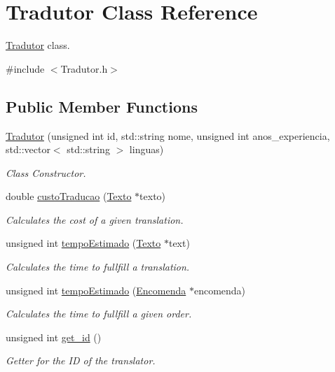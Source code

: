 \hypertarget{class_tradutor}{\section{Tradutor Class Reference}
\label{class_tradutor}
}


\hyperlink{class_tradutor}{Tradutor} class.  




{\ttfamily \#include $<$Tradutor.\-h$>$}

\subsection*{Public Member Functions}
\begin{DoxyCompactItemize}
\item 
\hyperlink{class_tradutor_a856f362e6c97ea42d04875e6c9d012e3}{Tradutor} (unsigned int id, std\-::string nome, unsigned int anos\-\_\-experiencia, std\-::vector$<$ std\-::string $>$ linguas)
\begin{DoxyCompactList}\small\item\em Class Constructor. \end{DoxyCompactList}\item 
double \hyperlink{class_tradutor_ab55718903fb3e7cc5c1b21b87d64393a}{custo\-Traducao} (\hyperlink{class_texto}{Texto} $\ast$texto)
\begin{DoxyCompactList}\small\item\em Calculates the cost of a given translation. \end{DoxyCompactList}\item 
unsigned int \hyperlink{class_tradutor_a1ca7c608db7e9145e8b9105e19e5900a}{tempo\-Estimado} (\hyperlink{class_texto}{Texto} $\ast$text)
\begin{DoxyCompactList}\small\item\em Calculates the time to fullfill a translation. \end{DoxyCompactList}\item 
unsigned int \hyperlink{class_tradutor_acd53cf00b851be61350100c9aa6ef3c0}{tempo\-Estimado} (\hyperlink{class_encomenda}{Encomenda} $\ast$encomenda)
\begin{DoxyCompactList}\small\item\em Calculates the time to fullfill a given order. \end{DoxyCompactList}\item 
unsigned int \hyperlink{class_tradutor_adc3d4f5ae46ebd92072c644f9fe0e479}{get\-\_\-id} ()
\begin{DoxyCompactList}\small\item\em Getter for the I\-D of the translator. \end{DoxyCompactList}\item 

\end{DoxyCompactItemize}
